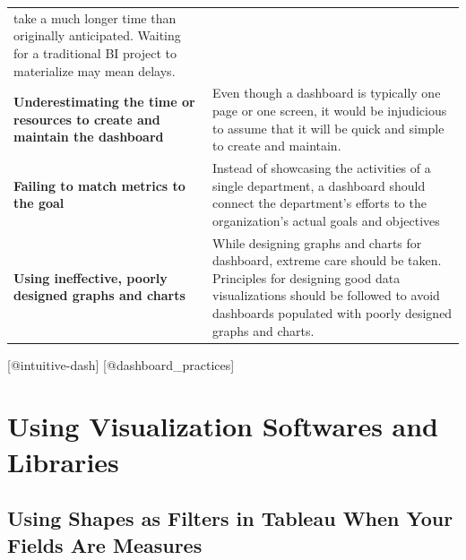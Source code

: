 \documentclass[]{book}
\theoremstyle{definition}
\theoremstyle{definition}
\theoremstyle{definition}
\theoremstyle{remark}
\begin{document}
\begin{longtable}[]{@{}ll@{}}
\begin{minipage}[t]{0.65\columnwidth}
take a much longer time than originally anticipated. Waiting for a
traditional BI project to materialize may mean delays.\strut
\end{minipage}\tabularnewline
\begin{minipage}[t]{0.24\columnwidth}\raggedright\strut
\textbf{Underestimating the time or resources to create and maintain the
dashboard}\strut
\end{minipage} & \begin{minipage}[t]{0.65\columnwidth}\raggedright\strut
Even though a dashboard is typically one page or one screen, it would be
injudicious to assume that it will be quick and simple to create and
maintain.\strut
\end{minipage}\tabularnewline
\begin{minipage}[t]{0.24\columnwidth}\raggedright\strut
\textbf{Failing to match metrics to the goal}\strut
\end{minipage} & \begin{minipage}[t]{0.65\columnwidth}\raggedright\strut
Instead of showcasing the activities of a single department, a dashboard
should connect the department's efforts to the organization's actual
goals and objectives\strut
\end{minipage}\tabularnewline
\begin{minipage}[t]{0.24\columnwidth}\raggedright\strut
\textbf{Using ineffective, poorly designed graphs and charts}\strut
\end{minipage} & \begin{minipage}[t]{0.65\columnwidth}\raggedright\strut
While designing graphs and charts for dashboard, extreme care should be
taken. Principles for designing good data visualizations should be
followed to avoid dashboards populated with poorly designed graphs and
charts.\strut
\end{minipage}\tabularnewline
\bottomrule
\end{longtable}

{[}@intuitive-dash{]} {[}@dashboard\_practices{]}

\section{Using Visualization Softwares and
Libraries}\label{using-visualization-softwares-and-libraries}

\subsection{Using Shapes as Filters in Tableau When Your Fields Are
Measures}\label{using-shapes-as-filters-in-tableau-when-your-fields-are-measures}
\end{document}

